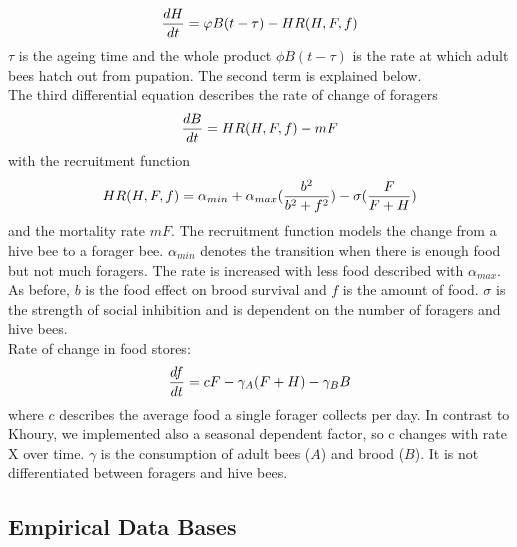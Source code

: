 \begin{equation}
{dH \over dt}=\phi B(t-\tau)-HR(H,F,f)
\end{equation}
$\tau$ is the ageing time and the whole product $\phi B(t-\tau)$ is the rate at which adult bees hatch out from pupation. The second term is explained below.\\ 
The third differential equation describes the rate of change of foragers  
\begin{equation}\label{Rate of change of foragers}
{dB \over dt} = HR(H,F,f)-m F
\end{equation}
with the recruitment function 
\begin{equation}\label{rate of change of foragers }
HR(H,F,f) = \alpha_{min} + \alpha_{max}({b^2 \over b^2+f^2})-\sigma({F \over F+H})
\end{equation}
and the mortality rate $mF$. The recruitment function models the change from a hive bee to a forager bee. $\alpha_{min}$ denotes the transition when there is enough food but not much foragers. The rate is increased with less food described with $\alpha_{max}$. As before, $b$ is the food effect on brood survival and $f$ is the amount of food. $\sigma$ is the strength of social inhibition and is dependent on the number of foragers and hive bees.\\
Rate of change in food stores:
\begin{equation}\label{Rate of change in food stores}
{df \over dt} = c F - \gamma_A (F+H) - \gamma_B B
\end{equation}
where $c$ describes the average food a single forager collects per day. In contrast to Khoury, we implemented also a seasonal dependent factor, so c changes with rate X over time. $\gamma$ is the consumption of adult bees ($A$) and brood ($B$). It is not differentiated between foragers and hive bees.  

\subsection{Empirical Data Bases}


